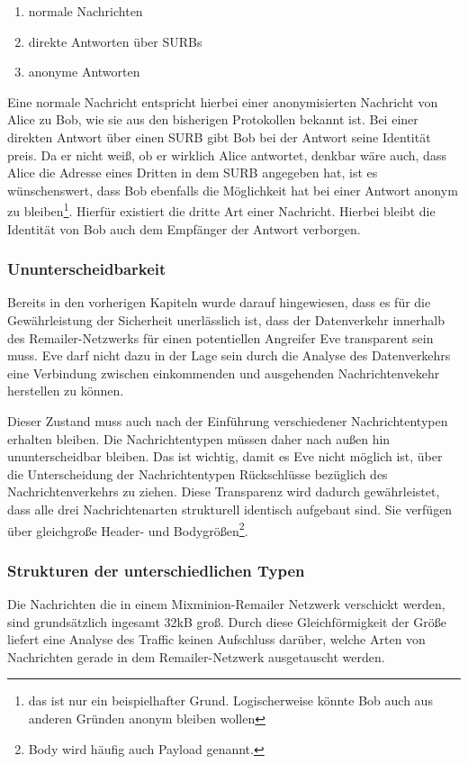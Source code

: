 \begin{enumerate}
\item normale Nachrichten
\item direkte Antworten über SURBs
\item anonyme Antworten
\end{enumerate}

Eine normale Nachricht entspricht hierbei einer anonymisierten Nachricht von Alice zu Bob, wie sie aus den bisherigen Protokollen bekannt ist. Bei einer direkten Antwort über einen SURB gibt Bob bei der Antwort seine Identität preis. Da er nicht weiß, ob er wirklich Alice antwortet, denkbar wäre auch, dass Alice die Adresse eines Dritten in dem SURB angegeben hat, ist es wünschenswert, dass Bob ebenfalls die Möglichkeit hat bei einer Antwort anonym zu bleiben\footnote{das ist nur ein beispielhafter Grund. Logischerweise könnte Bob auch aus anderen Gründen anonym bleiben wollen}. Hierfür existiert die dritte Art einer Nachricht. Hierbei bleibt die Identität von Bob auch dem Empfänger der Antwort verborgen.

\subsubsection{Ununterscheidbarkeit}
Bereits in den vorherigen Kapiteln wurde darauf hingewiesen, dass es für die Gewährleistung der Sicherheit unerlässlich ist, dass der Datenverkehr innerhalb des Remailer-Netzwerks für einen potentiellen Angreifer Eve transparent sein muss. Eve darf nicht dazu in der Lage sein durch die Analyse des Datenverkehrs eine Verbindung zwischen einkommenden und ausgehenden Nachrichtenvekehr herstellen zu können.

Dieser Zustand muss auch nach der Einführung verschiedener Nachrichtentypen erhalten bleiben.  Die Nachrichtentypen müssen daher nach außen hin ununterscheidbar bleiben. Das ist wichtig, damit es Eve nicht möglich ist, über die Unterscheidung der Nachrichtentypen Rückschlüsse bezüglich des Nachrichtenverkehrs zu ziehen. Diese Transparenz wird dadurch gewährleistet, dass alle drei Nachrichtenarten strukturell identisch aufgebaut sind. Sie verfügen über gleichgroße Header- und Bodygrößen\footnote{Body wird häufig auch Payload genannt.}.

\subsubsection{Strukturen der unterschiedlichen Typen}
Die Nachrichten die in einem Mixminion-Remailer Netzwerk verschickt werden, sind grundsätzlich ingesamt 32kB groß. Durch diese Gleichförmigkeit der Größe liefert eine Analyse des Traffic keinen Aufschluss darüber, welche Arten von Nachrichten gerade in dem Remailer-Netzwerk ausgetauscht werden.


